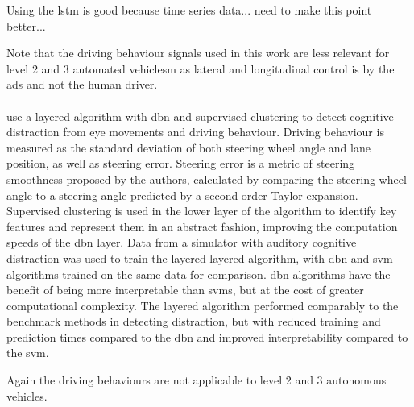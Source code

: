 \documentclass[11pt, parskip=half*,twoside=false]{scrbook}
\begin{document}
Using the \gls{lstm} is good because time series data... need to make this point better... 

Note that the driving behaviour signals used in this work are less relevant for level 2 and 3 automated vehiclesm as lateral and longitudinal control is by the \gls{ads} and not the human driver.

\paragraph{\citet{liangHybridBayesianNetwork2014}} use a layered algorithm with \gls{dbn} and supervised clustering to detect cognitive distraction from eye movements and driving behaviour. Driving behaviour is measured as the standard deviation of both steering wheel angle and lane position, as well as steering error. Steering error is a metric of steering smoothness proposed by the authors, calculated by comparing the steering wheel angle to a steering angle predicted by a second-order Taylor expansion. Supervised clustering is used in the lower layer of the algorithm to identify key features and represent them in an abstract fashion, improving the computation speeds of the \gls{dbn} layer.  Data from a simulator with auditory cognitive distraction was used to train the layered layered algorithm, with \gls{dbn} and \gls{svm} algorithms trained on the same data for comparison. \gls{dbn} algorithms have the benefit of being more interpretable than \glspl{svm}, but at the cost of greater computational complexity. The layered algorithm performed comparably to the benchmark methods in detecting distraction, but with reduced training and prediction times compared to the \gls{dbn} and improved interpretability compared to the \gls{svm}. 

Again the driving behaviours are not applicable to level 2 and 3 autonomous vehicles.
\end{document}
